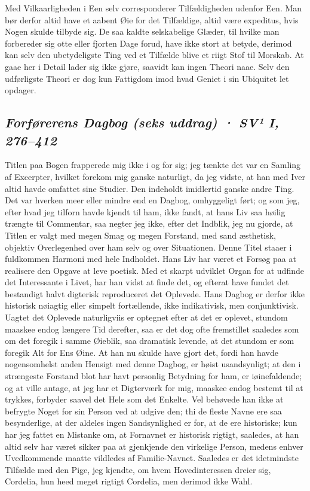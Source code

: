 \documentclass[12pt,a4paper]{article}
\newcommand{\sectionheading}[1]{\subsection*{\normalfont\itshape #1}}
\begin{document}
Med Vilkaarligheden i Een selv corresponderer Tilfældigheden udenfor Een. Man bør derfor altid have et aabent Øie for det Tilfældige, altid være expeditus, hvis Nogen skulde tilbyde sig. De saa kaldte selskabelige Glæder, til hvilke man forbereder sig otte eller fjorten Dage forud, have ikke stort at betyde, derimod kan selv den ubetydeligste Ting ved et Tilfælde blive et riigt Stof til Morskab. At gaae her i Detail lader sig ikke gjøre, saavidt kan ingen Theori naae. Selv den udførligste Theori er dog kun Fattigdom imod hvad Geniet i sin Ubiquitet let opdager.

\sectionheading{Forførerens Dagbog (seks uddrag)  ·  SV¹ I, 276–412}

Titlen paa Bogen frapperede mig ikke i og for sig; jeg tænkte det var en Samling af Excerpter, hvilket forekom mig ganske naturligt, da jeg vidste, at han med Iver altid havde omfattet sine Studier. Den indeholdt imidlertid ganske andre Ting. Det var hverken meer eller mindre end en Dagbog, omhyggeligt ført; og som jeg, efter hvad jeg tilforn havde kjendt til ham, ikke fandt, at hans Liv saa høilig trængte til Commentar, saa negter jeg ikke, efter det Indblik, jeg nu gjorde, at Titlen er valgt med megen Smag og megen Forstand, med sand æsthetisk, objektiv Overlegenhed over ham selv og over Situationen. Denne Titel staaer i fuldkommen Harmoni med hele Indholdet. Hans Liv har været et Forsøg paa at realisere den Opgave at leve poetisk. Med et skarpt udviklet Organ for at udfinde det Interessante i Livet, har han vidst at finde det, og efterat have fundet det bestandigt halvt digterisk reproduceret det Oplevede. Hans Dagbog er derfor ikke historisk nøiagtig eller simpelt fortællende, ikke indikativisk, men conjunktivisk. Uagtet det Oplevede naturligviis er optegnet efter at det er oplevet, stundom maaskee endog længere Tid derefter, saa er det dog ofte fremstillet saaledes som om det foregik i samme Øieblik, saa dramatisk levende, at det stundom er som foregik Alt for Ens Øine. At han nu skulde have gjort det, fordi han havde nogensomhelst anden Hensigt med denne Dagbog, er høist usandsynligt; at den i strængeste Forstand blot har havt personlig Betydning for ham, er iøinefaldende; og at ville antage, at jeg har et Digterværk for mig, maaskee endog bestemt til at trykkes, forbyder saavel det Hele som det Enkelte. Vel behøvede han ikke at befrygte Noget for sin Person ved at udgive den; thi de fleste Navne ere saa besynderlige, at der aldeles ingen Sandsynlighed er for, at de ere historiske; kun har jeg fattet en Mistanke om, at Fornavnet er historisk rigtigt, saaledes, at han altid selv har været sikker paa at gjenkjende den virkelige Person, medens enhver Uvedkommende maatte vildledes af Familie-Navnet. Saaledes er det idetmindste Tilfælde med den Pige, jeg kjendte, om hvem Hovedinteressen dreier sig, Cordelia, hun heed meget rigtigt Cordelia, men derimod ikke Wahl.
\end{document}
